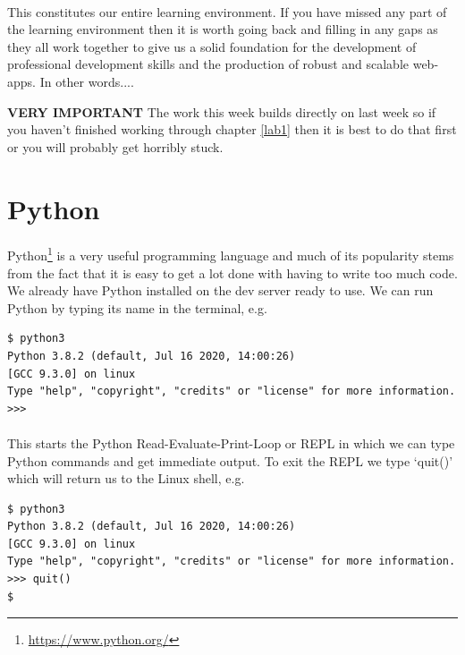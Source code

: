 \documentclass[12pt, a4paper, oneside]{book}
\begin{document}
\paragraph{} This constitutes our entire learning environment. If you have missed any part of the learning environment then it is worth going back and filling in any gaps as they all work together to give us a solid foundation for the development of professional development skills and the production of robust and scalable web-apps. In other words....

\begin{framed}
\textbf{VERY IMPORTANT} The work this week builds directly on last week so if you haven't finished working through chapter \ref{lab1} then it is best to do that first or you will probably get horribly stuck.
\end{framed}

\section{Python}
\label{python}
\paragraph{} Python\footnote{\url{https://www.python.org/}} is a very useful programming language and much of its popularity stems from the fact that it is easy to get a lot done with having to write too much code. We already have Python installed on the dev server ready to use. We can run Python by typing its name in the terminal, e.g.

\begin{lstlisting}[style=DOS]
$ python3
Python 3.8.2 (default, Jul 16 2020, 14:00:26) 
[GCC 9.3.0] on linux
Type "help", "copyright", "credits" or "license" for more information.
>>>
\end{lstlisting}
\paragraph{} This starts the Python Read-Evaluate-Print-Loop or REPL in which we can type Python commands and get immediate output. To exit the REPL we type `quit()' which will return us to the Linux shell, e.g.

\begin{lstlisting}[style=DOS]
$ python3
Python 3.8.2 (default, Jul 16 2020, 14:00:26) 
[GCC 9.3.0] on linux
Type "help", "copyright", "credits" or "license" for more information.
>>> quit()
$ 
\end{lstlisting}
\end{document}
